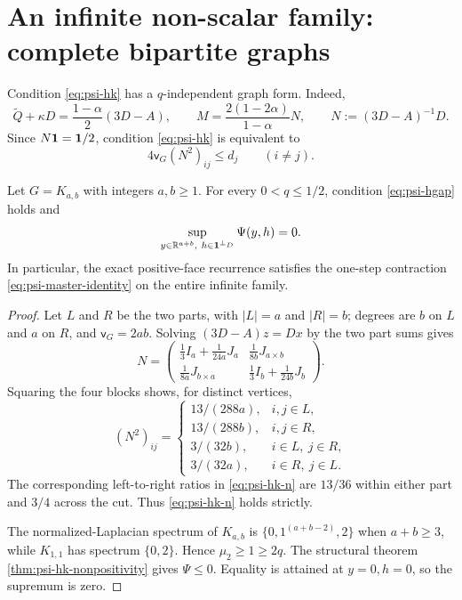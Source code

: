 \documentclass[11pt]{article}
\begin{document}
\section{An infinite non-scalar family: complete bipartite graphs}

Condition \cref{eq:psi-hk} has a $q$-independent graph form.  Indeed,
\begin{equation}
 \widetilde Q+\kappa D
 =\frac{1-\alpha}{2}(3D-A),
 \qquad
 M=\frac{2(1-2\alpha)}{1-\alpha}N,
 \qquad
 N:=(3D-A)^{-1}D.
 \label{eq:psi-n-resolvent}
\end{equation}
Since $N\mathbf{1}=\mathbf{1}/2$, condition \cref{eq:psi-hk} is equivalent to
\begin{equation}
 4\mathsf v_G(N^2)_{ij}\leq d_j
 \qquad(i\neq j).
 \label{eq:psi-hk-n}
\end{equation}

\begin{theorem}
\label{thm:psi-complete-bipartite}
Let $G=K_{a,b}$ with integers $a,b\geq1$.  For every $0<q\leq1/2$,
condition \cref{eq:psi-hgap} holds and
\begin{equation}
 \sup_{y\in\mathbb R^{a+b},\ h\in\one^{\perp_D}}\Psi(y,h)=0.
 \label{eq:psi-complete-bipartite-sup}
\end{equation}
In particular, the exact positive-face recurrence satisfies the one-step
contraction \cref{eq:psi-master-identity} on the entire infinite family.
\end{theorem}

\begin{proof}
Let $L$ and $R$ be the two parts, with $|L|=a$ and $|R|=b$; degrees are $b$
on $L$ and $a$ on $R$, and $\mathsf v_G=2ab$.  Solving
$(3D-A)z=Dx$ by the two part sums gives
\begin{equation}
 N=
 \begin{pmatrix}
 \frac13I_a+\frac1{24a}J_a&\frac1{8b}J_{a\times b}\\[2mm]
 \frac1{8a}J_{b\times a}&\frac13I_b+\frac1{24b}J_b
 \end{pmatrix}.
 \label{eq:psi-kab-n}
\end{equation}
Squaring the four blocks shows, for distinct vertices,
\begin{equation}
 (N^2)_{ij}=
 \begin{cases}
  13/(288a),&i,j\in L,\\
  13/(288b),&i,j\in R,\\
  3/(32b),&i\in L,\ j\in R,\\
  3/(32a),&i\in R,\ j\in L.
 \end{cases}
 \label{eq:psi-kab-n2}
\end{equation}
The corresponding left-to-right ratios in \cref{eq:psi-hk-n} are
$13/36$ within either part and $3/4$ across the cut.  Thus
\cref{eq:psi-hk-n} holds strictly.

The normalized-Laplacian spectrum of $K_{a,b}$ is
$\{0,1^{(a+b-2)},2\}$ when $a+b\geq3$, while $K_{1,1}$ has spectrum
$\{0,2\}$.  Hence $\mu_2\geq1\geq2q$.  The structural theorem
\cref{thm:psi-hk-nonpositivity} gives $\Psi\leq0$.  Equality is attained at
$y=0,h=0$, so the supremum is zero.
\end{proof}
\end{document}
